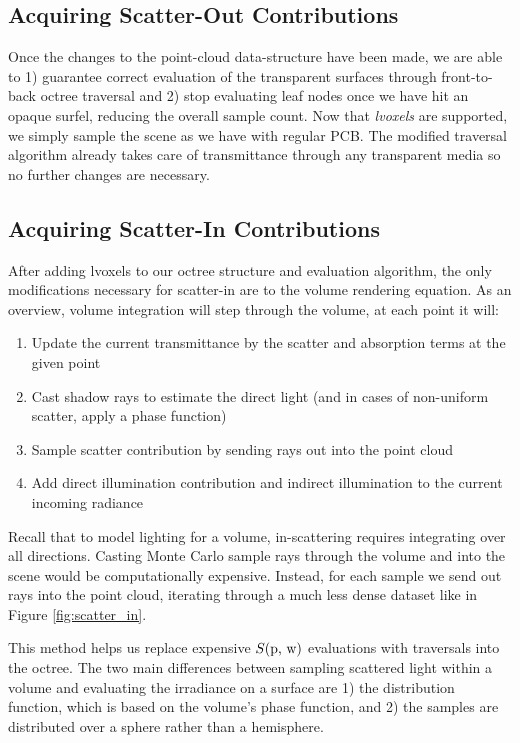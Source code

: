 \documentclass[12pt]{ucthesis}
\begin{document}
\subsection{Acquiring Scatter-Out Contributions}
\label{scatterout_sec}

Once the changes to the point-cloud data-structure have been made, we are able to 1) guarantee correct evaluation of the transparent surfaces through front-to-back octree traversal and 2) stop evaluating leaf nodes once we have hit an opaque surfel, reducing the overall sample count.  Now that \textit{lvoxels} are supported, we simply sample the scene as we have with regular PCB.  The modified traversal algorithm already takes care of transmittance through any transparent media so no further changes are necessary.

\subsection{Acquiring Scatter-In Contributions}
\label{scatterin_sec}
After adding lvoxels to our octree structure and evaluation algorithm, the only modifications necessary for scatter-in are to the volume rendering equation.  As an overview, volume integration will step through the volume, at each point it will:

\begin{enumerate}
\item Update the current transmittance by the scatter and absorption terms at the given point
\item Cast shadow rays to estimate the direct light (and in cases of non-uniform scatter, apply a phase function)
\item Sample scatter contribution by sending rays out into the point cloud
\item Add direct illumination contribution and indirect illumination to the current incoming radiance
\end{enumerate}

Recall that to model lighting for a volume, in-scattering requires integrating over all directions.  Casting Monte Carlo sample rays through the volume and into the scene would be computationally expensive.  Instead, for each sample we send out rays into the point cloud, iterating through a much less dense dataset like in Figure \ref{fig:scatter_in}.

This method helps us replace expensive $S(\textup{p, w})$ evaluations with traversals into the octree.  The two main differences between sampling scattered light within a volume and evaluating the irradiance on a surface are 1) the distribution function, which is based on the volume's phase function, and 2) the samples are distributed over a sphere rather than a hemisphere.
\end{document}
